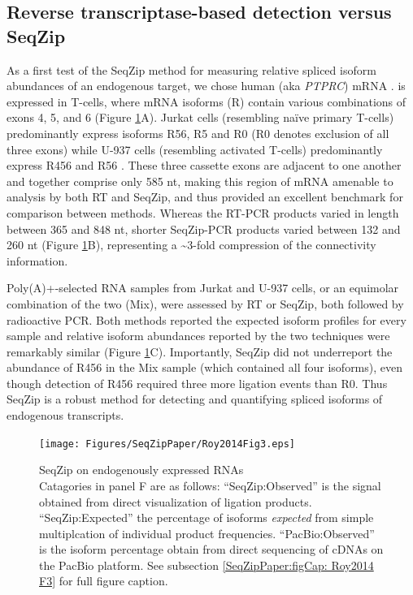 	\subsection{Reverse transcriptase-based detection versus SeqZip}
		\label{SeqZipPaper:subsec: SeqZip comparable to RT}

		As a first test of the SeqZip method for measuring relative spliced isoform abundances of an endogenous target, we chose human \cd{} (aka \textit{PTPRC}) mRNA \citep{Zikherman2008}. \cd{} is expressed in T-cells, where mRNA isoforms (R) contain various combinations of exons 4, 5, and 6 (Figure \ref{SeqZipPaper:fig:Roy2014 F3}A). Jurkat cells (resembling naïve primary T-cells) predominantly express isoforms R56, R5 and R0 (R0 denotes exclusion of all three exons) while U-937 cells (resembling activated T-cells) predominantly express R456 and R56 \citep{Yeakley2002}. These three cassette exons are adjacent to one another and together comprise only 585 nt, making this region of \cd{} mRNA amenable to analysis by both RT and SeqZip, and thus provided an excellent benchmark for comparison between methods. Whereas the RT-PCR products varied in length between 365 and 848 nt, shorter SeqZip-PCR products varied between 132 and 260 nt (Figure \ref{SeqZipPaper:fig:Roy2014 F3}B), representing a \textasciitilde 3-fold compression of the connectivity information.

		Poly(A)+-selected RNA samples from Jurkat and U-937 cells, or an equimolar combination of the two (Mix), were assessed by RT or SeqZip, both followed by radioactive PCR. Both methods reported the expected isoform profiles for every sample and relative isoform abundances reported by the two techniques were remarkably similar (Figure \ref{SeqZipPaper:fig:Roy2014 F3}C). Importantly, SeqZip did not underreport the abundance of R456 in the Mix sample (which contained all four isoforms), even though detection of R456 required three more ligation events than R0. Thus SeqZip is a robust method for detecting and quantifying spliced isoforms of endogenous transcripts. 

		\begin{figure} %
			\centering 
			\texttt{[image: Figures/SeqZipPaper/Roy2014Fig3.eps]}
			\caption[SeqZip on endogenously expressed RNAs]
			{
				SeqZip on endogenously expressed RNAs\\[0.25cm]
				Catagories in panel F are as follows: ``SeqZip:Observed'' is the signal obtained from direct visualization of ligation products. ``SeqZip:Expected'' the percentage of isoforms \textit{expected} from simple multiplcation of individual product frequencies. ``PacBio:Observed'' is the isoform percentage obtain from direct sequencing of \fn{} cDNAs on the PacBio platform. See subsection \ref{SeqZipPaper:figCap: Roy2014 F3} for full figure caption.
				}
			\label{SeqZipPaper:fig:Roy2014 F3}
			\end{figure}

